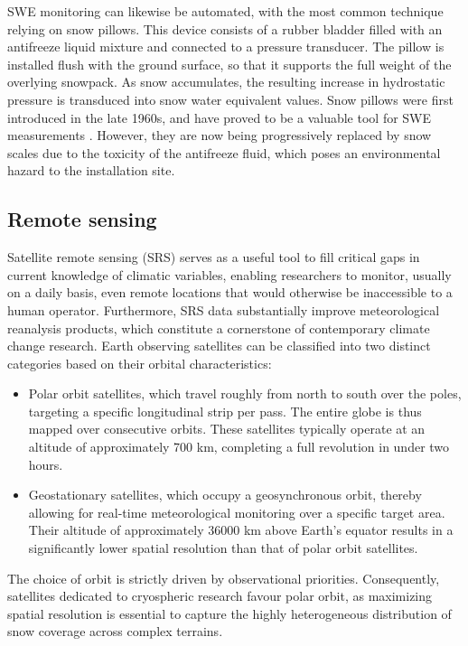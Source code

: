 SWE monitoring can likewise be automated, with the most common technique relying on snow pillows. This device consists of a rubber bladder filled with 
an antifreeze liquid mixture and connected to a pressure transducer. The pillow is installed flush with the ground 
surface, so that it supports the full weight of the overlying snowpack. As snow accumulates, the resulting increase in hydrostatic pressure is 
transduced into snow water equivalent values. Snow pillows were first introduced in the late 1960s, and have proved to be a valuable 
tool for SWE measurements \parencite{SnowPillow_Hood}. However, they are now being progressively replaced by snow scales due to the toxicity of the 
antifreeze fluid, which poses an environmental hazard to the installation site.



\subsection{Remote sensing}

Satellite remote sensing (SRS) serves as a useful tool to fill critical gaps in current knowledge of climatic variables, enabling researchers 
to monitor, usually on a daily basis, even remote locations that would otherwise be inaccessible to a human operator. Furthermore, SRS data substantially 
improve meteorological reanalysis products, which constitute a cornerstone of contemporary climate change research. Earth observing satellites can be 
classified into two distinct categories based on their orbital characteristics:

\begin{itemize}[label=$\blacktriangleright$]
    \item Polar orbit satellites, which travel roughly from north to south over the poles, targeting a specific longitudinal strip per pass. The 
    entire globe is thus mapped over consecutive orbits. These satellites typically operate at an altitude of approximately 700 km, completing a full 
    revolution in under two hours.
    \item Geostationary satellites, which occupy a geosynchronous orbit, thereby allowing for real-time meteorological monitoring over a specific target 
    area. Their altitude of approximately 36000 km above Earth's equator results in a significantly lower spatial resolution than that of polar orbit 
    satellites.
\end{itemize}

The choice of orbit is strictly driven by observational priorities. Consequently, satellites dedicated to cryospheric research favour polar orbit, as
maximizing spatial resolution is essential to capture the highly heterogeneous distribution of snow coverage across complex terrains. 

